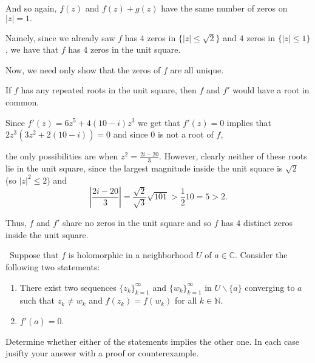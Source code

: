 \documentclass[12pt]{Homework}
\begin{document}
\begin{solution}
And so again, $f(z)$ and $f(z)+g(z)$ have the same number of zeros on $|z|=1.$

Namely, since we already saw $f$ has $4$ zeros in $\{|z|\le\sqrt{2}\}$ and $4$ zeros in $\{|z|\le 1\}$, we have that $f$ has $4$ zeros in the unit square.

Now, we need only show that the zeros of $f$ are all unique.

If $f$ has any repeated roots in the unit square, then $f$ and $f'$ would have a root in common.

Since $f'(z)=6z^5+4(10-i)z^3$ we get that $f'(z)=0$ implies that $2z^3(3z^2+2(10-i))=0$ and since $0$ is not a root of $f$,

the only possibilities are when $z^2=\frac{2i-20}{3}$. However, clearly neither of these roots lie in the unit square, since the largest magnitude inside the unit square is $\sqrt{2}$ (so $|z|^2\le 2$) and $$|\frac{2i-20}{3}|=\frac{\sqrt{2}}{\sqrt{3}}\sqrt{101}>\frac{1}{2}10=5>2.$$

Thus, $f$ and $f'$ share no zeros in the unit square and so $f$ has $4$ distinct zeros inside the unit square.
\end{solution}
\newpage




\begin{problem} $\,$
Suppose that $f$ is holomorphic in a neighborhood $U$ of $a\in\mathbb{C}$. Consider the following two statements:
\begin{enumerate}[label=(\roman*)]
    \item There exist two sequences $\{z_k\}_{k=1}^\infty$ and $\{w_k\}_{k=1}^\infty$ in $U\backslash\{a\}$ converging to $a$ such that $z_k\not=w_k$ and $f(z_k)=f(w_k)$ for all $k\in\mathbb{N}$.
    \item $f'(a)=0$.
\end{enumerate}
Determine whether either of the statements implies the other one. In each case jusifty your answer with a proof or counterexample.
\end{problem}
\end{document}
